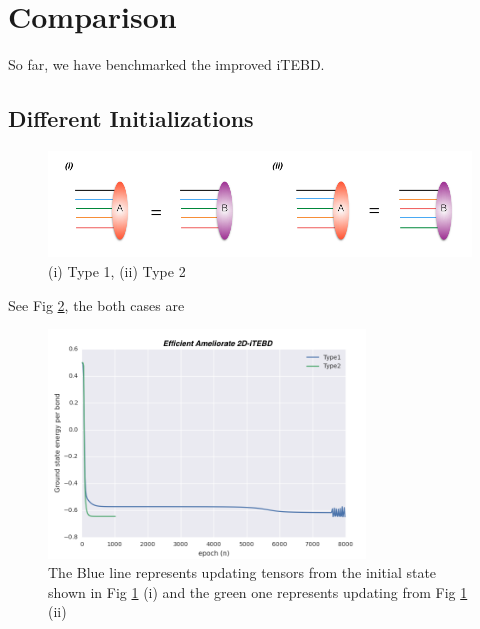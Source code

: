 \section{Comparison}

So far, we have benchmarked the improved iTEBD. 

\label{Comparison}
\subsection{Different Initializations}

\begin{figure}[ht]
	\centering
	\includegraphics[width=1.00\textwidth]{figures/fig322.png}
	\caption[Different methods to initialize the states]{(i) Type 1, (ii) Type 2}
	\label{fig322}
\end{figure}

See Fig \ref{fig323}, the both cases are 

\begin{figure}[ht]
	\centering
	\includegraphics[width=0.75\textwidth]{figures/fig323.png}
	\caption[Comparison the results of Heisenberg model on square lattice which are obtaining from different initial states.]{The Blue line represents updating tensors from the initial state shown in Fig \ref{fig322} (i) and the green one represents updating from Fig \ref{fig322} (ii)}
	\label{fig323}
\end{figure}

